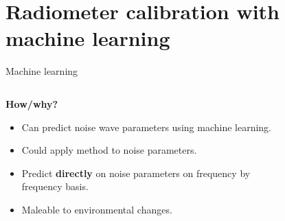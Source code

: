 \documentclass[aspectratio=169]{beamer}
\begin{document}
\section{Radiometer calibration with machine learning}
\begin{frame}{\small{Machine learning}}
	\begin{columns}
		\begin{column}{0.35\textwidth}
			\textbf{How/why?}
			\begin{itemize}
				\item Can predict noise wave parameters using machine learning.
				\item Could apply method to noise parameters.
				\item Predict \textbf{directly} on noise parameters on frequency by frequency basis.
				\item Maleable to environmental changes.
			\end{itemize}
		\end{column}
		\begin{column}{0.65\textwidth}
			\begin{figure}[h]
				
			\end{figure}
		\end{column}
	\end{columns}
\end{frame}
\end{document}
